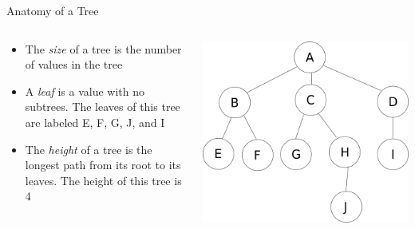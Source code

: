 \documentclass[
  ignorenonframetext,
]{beamer}
\begin{document}
\begin{frame}{Anatomy of a Tree}
\protect\hypertarget{anatomy-of-a-tree}{}
\begin{columns}[T]
\begin{column}{0.6\textwidth}
\begin{itemize}
\item
  The \emph{size} of a tree is the number of values in the tree
\item
  A \emph{leaf} is a value with no subtrees. The leaves of this tree are
  labeled E, F, G, J, and I
\item
  The \emph{height} of a tree is the longest path from its root to its
  leaves. The height of this tree is 4
\end{itemize}
\end{column}

\begin{column}{0.4\textwidth}
\includegraphics{images/tree.png}
\end{column}
\end{columns}
\end{frame}
\end{document}
